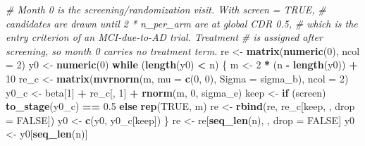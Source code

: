 \documentclass[
  11pt,
]{article}
\newenvironment{Shaded}{\begin{snugshade}}{\end{snugshade}}
\newcommand{\AttributeTok}[1]{\textcolor[rgb]{0.13,0.29,0.53}{#1}}
\newcommand{\CommentTok}[1]{\textcolor[rgb]{0.56,0.35,0.01}{\textit{#1}}}
\newcommand{\ConstantTok}[1]{\textcolor[rgb]{0.56,0.35,0.01}{#1}}
\newcommand{\ControlFlowTok}[1]{\textcolor[rgb]{0.13,0.29,0.53}{\textbf{#1}}}
\newcommand{\DecValTok}[1]{\textcolor[rgb]{0.00,0.00,0.81}{#1}}
\newcommand{\FloatTok}[1]{\textcolor[rgb]{0.00,0.00,0.81}{#1}}
\newcommand{\FunctionTok}[1]{\textcolor[rgb]{0.13,0.29,0.53}{\textbf{#1}}}
\newcommand{\NormalTok}[1]{#1}
\newcommand{\OtherTok}[1]{\textcolor[rgb]{0.56,0.35,0.01}{#1}}
\newcommand{\SpecialCharTok}[1]{\textcolor[rgb]{0.81,0.36,0.00}{\textbf{#1}}}
\begin{document}
\begin{Shaded}
\begin{Highlighting}[]
  \CommentTok{\# Month 0 is the screening/randomization visit. With screen = TRUE,}
  \CommentTok{\# candidates are drawn until 2 * n\_per\_arm are at global CDR 0.5,}
  \CommentTok{\# which is the entry criterion of an MCI{-}due{-}to{-}AD trial. Treatment}
  \CommentTok{\# is assigned after screening, so month 0 carries no treatment term.}
\NormalTok{  re }\OtherTok{\textless{}{-}} \FunctionTok{matrix}\NormalTok{(}\FunctionTok{numeric}\NormalTok{(}\DecValTok{0}\NormalTok{), }\AttributeTok{ncol =} \DecValTok{2}\NormalTok{)}
\NormalTok{  y0 }\OtherTok{\textless{}{-}} \FunctionTok{numeric}\NormalTok{(}\DecValTok{0}\NormalTok{)}
  \ControlFlowTok{while}\NormalTok{ (}\FunctionTok{length}\NormalTok{(y0) }\SpecialCharTok{\textless{}}\NormalTok{ n) \{}
\NormalTok{    m }\OtherTok{\textless{}{-}} \DecValTok{2} \SpecialCharTok{*}\NormalTok{ (n }\SpecialCharTok{{-}} \FunctionTok{length}\NormalTok{(y0)) }\SpecialCharTok{+} \DecValTok{10}
\NormalTok{    re\_c }\OtherTok{\textless{}{-}} \FunctionTok{matrix}\NormalTok{(}\FunctionTok{mvrnorm}\NormalTok{(m, }\AttributeTok{mu =} \FunctionTok{c}\NormalTok{(}\DecValTok{0}\NormalTok{, }\DecValTok{0}\NormalTok{), }\AttributeTok{Sigma =}\NormalTok{ sigma\_b), }\AttributeTok{ncol =} \DecValTok{2}\NormalTok{)}
\NormalTok{    y0\_c }\OtherTok{\textless{}{-}}\NormalTok{ beta[}\DecValTok{1}\NormalTok{] }\SpecialCharTok{+}\NormalTok{ re\_c[, }\DecValTok{1}\NormalTok{] }\SpecialCharTok{+} \FunctionTok{rnorm}\NormalTok{(m, }\DecValTok{0}\NormalTok{, sigma\_e)}
\NormalTok{    keep }\OtherTok{\textless{}{-}} \ControlFlowTok{if}\NormalTok{ (screen) }\FunctionTok{to\_stage}\NormalTok{(y0\_c) }\SpecialCharTok{==} \FloatTok{0.5} \ControlFlowTok{else} \FunctionTok{rep}\NormalTok{(}\ConstantTok{TRUE}\NormalTok{, m)}
\NormalTok{    re }\OtherTok{\textless{}{-}} \FunctionTok{rbind}\NormalTok{(re, re\_c[keep, , }\AttributeTok{drop =} \ConstantTok{FALSE}\NormalTok{])}
\NormalTok{    y0 }\OtherTok{\textless{}{-}} \FunctionTok{c}\NormalTok{(y0, y0\_c[keep])}
\NormalTok{  \}}
\NormalTok{  re }\OtherTok{\textless{}{-}}\NormalTok{ re[}\FunctionTok{seq\_len}\NormalTok{(n), , drop }\OtherTok{=} \ConstantTok{FALSE}\NormalTok{]}
\NormalTok{  y0 }\OtherTok{\textless{}{-}}\NormalTok{ y0[}\FunctionTok{seq\_len}\NormalTok{(n)]}


\end{Highlighting}
\end{Shaded}
\end{document}
